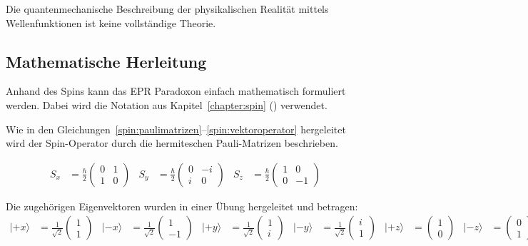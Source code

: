\begin{refsection}
\begin{satz}
    Die quantenmechanische Beschreibung der physikalischen Realit\"at mittels
    Wellenfunktionen ist keine vollst\"andige Theorie.
\end{satz}

\subsection{Mathematische Herleitung\label{subsection:bell:epr:herleitung}}
Anhand des Spins kann das EPR Paradoxon einfach mathematisch formuliert werden.
Dabei wird die Notation aus Kapitel~\ref{chapter:spin} ()
verwendet.

Wie in den Gleichungen~\ref{spin:paulimatrizen}--\ref{spin:vektoroperator}
hergeleitet wird der Spin-Operator durch die hermiteschen Pauli-Matrizen
beschrieben.

\begin{align*}
    S_x &= \frac{\hbar}{2} \begin{pmatrix}
    0 & 1 \\ 1 & 0
    \end{pmatrix}
    &
    S_y &= \frac{\hbar}{2} \begin{pmatrix}
    0 & -i \\ i & 0
    \end{pmatrix}
    &
    S_z &= \frac{\hbar}{2} \begin{pmatrix}
    1 & 0 \\ 0 & -1
    \end{pmatrix}
\end{align*}

Die zugeh\"origen Eigenvektoren wurden in einer \"Ubung hergeleitet und
betragen:
\begin{align*}
    |{+}x\rangle &= \frac{1}{\sqrt{2}}\begin{pmatrix} 1\\1 \end{pmatrix} &
    |{-}x\rangle &= \frac{1}{\sqrt{2}}\begin{pmatrix} 1\\-1 \end{pmatrix} &
    |{+}y\rangle &= \frac{1}{\sqrt{2}}\begin{pmatrix} 1\\i \end{pmatrix} &
    |{-}y\rangle &= \frac{1}{\sqrt{2}}\begin{pmatrix} i\\1 \end{pmatrix} &
    |{+}z\rangle &= \begin{pmatrix} 1\\0 \end{pmatrix} &
    |{-}z\rangle &= \begin{pmatrix} 0\\1 \end{pmatrix} &
\end{align*}


\end{refsection}
